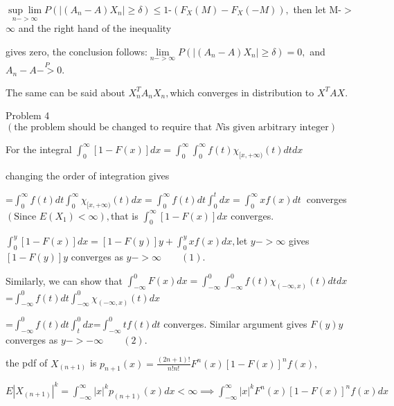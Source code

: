 \documentclass{article}
\def\TEXTsymbol#1{\mbox{$#1$}}%
\begin{document}
$\underset{n->\infty }{\sup \lim }P\left( \left\vert \left( A_{n}-A\right)
X_{n}\right\vert \geq \delta \right) \leq 1$-$\left( F_{X}\left( M\right)
-F_{X}\left( -M\right) \right) ,$ then let M-\TEXTsymbol{>}$\infty $ and the
right hand of the inequality

gives zero, the conclusion follows:$\underset{n->\infty }{\lim }P\left(
\left\vert \left( A_{n}-A\right) X_{n}\right\vert \geq \delta \right) =0,$
and $A_{n}-A\overset{P}{->}0.$

The same can be said about $X_{n}^{T}A_{n}X_{n},$which converges in
distribution to $X^{T}AX.$

Problem 4$\left( \text{the problem should be changed to require that }N\text{
is given arbitrary integer}\right) $  %


For the integral $\int_{0}^{\infty }\left[ 1-F\left( x\right) \right]
dx=\int_{0}^{\infty }\int_{0}^{\infty }f(t)\chi _{\lbrack x,+\infty )}(t)dtdx
$

changing the order of integration gives

=$\int_{0}^{\infty }f(t)dt\int_{0}^{\infty }\chi _{\lbrack x,+\infty
)}(t)dx=\int_{0}^{\infty }f(t)dt\int_{0}^{t}dx=\int_{0}^{\infty }xf(x)dt\ $%
converges$\left( \text{Since }E\left( X_{1}\right) <\infty \right) ,$that is
$\int_{0}^{\infty }\left[ 1-F\left( x\right) \right] dx$ converges.

$\int_{0}^{y}\left[ 1-F\left( x\right) \right] dx=\left[ 1-F\left( y\right) %
\right] y+\int_{0}^{y}xf\left( x\right) dx,$let $y->\infty $ gives $\left[
1-F\left( y\right) \right] y$ converges as $y->\infty \qquad \left( 1\right) 
$.

Similarly, we can show that $\int_{-\infty }^{0}F\left( x\right)
dx=\int_{-\infty }^{0}\int_{-\infty }^{0}f(t)\chi _{\left( -\infty ,x\right)
}(t)dtdx$=$\int_{-\infty }^{0}f(t)dt\int_{-\infty }^{0}\chi _{\left( -\infty
,x\right) }(t)dx$

=$\int_{-\infty }^{0}f(t)dt\int_{t}^{0}dx$=$\int_{-\infty }^{0}tf(t)dt$
converges. Similar argument gives $F\left( y\right) y$ converges as $%
y->-\infty \qquad \left( 2\right) .$

the pdf of $X_{\left( n+1\right) }$ is $p_{n+1}\left( x\right) =\frac{\left(
2n+1\right) !}{n!n!}F^{n}\left( x\right) \left[ 1-F\left( x\right) \right]
^{n}f\left( x\right) ,$

$E\left\vert X_{\left( n+1\right) }\right\vert ^{k}=\int_{-\infty }^{\infty
}\left\vert x\right\vert ^{k}p_{\left( n+1\right) }\left( x\right) dx<\infty
\implies \int_{-\infty }^{\infty }\left\vert x\right\vert ^{k}F^{n}\left(
x\right) \left[ 1-F\left( x\right) \right] ^{n}f\left( x\right) dx$
\end{document}
